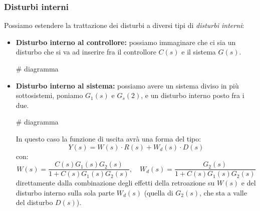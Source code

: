\documentclass[a4paper,11pt]{article}
\begin{document}
\subsubsection{Disturbi interni}
Possiamo estendere la trattazione dei disturbi a diversi tipi di \textit{disturbi interni}:
\begin{itemize}
	\item \textbf{Disturbo interno al controllore:} possiamo immaginare che ci sia un disturbo che si va ad inserire fra il controllore $C(s)$ e il sistema $G(s)$.
		
		# diagramma

	\item \textbf{Disturbo interno al sistema:} possiamo avere un sistema diviso in più sottosistemi, poniamo $G_1(s)$ e $G_s(2)$, e un disturbo interno posto fra i due.
		
		# diagramma

		In questo caso la funzione di uscita avrà una forma del tipo:
		$$
		Y(s) = W(s) \cdot R(s) + W_d(s) \cdot D(s)
		$$
		con:
		$$
		W(s) = \frac{C(s) G_1(s) G_2(s)}{1 + C(s) G_1(s) G_2(s)}, \quad W_d(s) = \frac{G_2(s)}{1 + C(s) G_1(s) G_2(s)}
		$$
		direttamente dalla combinazione degli effetti della retroazione su $W(s)$ e del disturbo interno sulla sola parte $W_d(s)$ (quella di $G_2(s)$, che sta a valle del disturbo $D(s)$).
		
\end{itemize}
\end{document}
